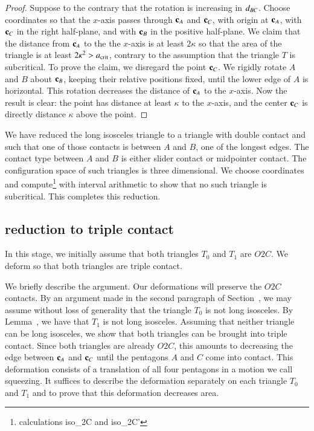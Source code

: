 \begin{proof} 
  Suppose to the contrary that the rotation is increasing in
  $d_{BC}$.  Choose coordinates so that the $x$-axis passes through
  ${\mathbf c}_A$ and ${\mathbf c}_C$, with origin at ${\mathbf c}_A$, with ${\mathbf c}_C$ in the right
  half-plane, and with ${\mathbf c}_B$ in the positive half-plane.  We claim
  that the distance from ${\mathbf c}_A$ to the the $x$-axis is at least
  $2\kappa$ so that the area of the triangle is at least $2\kappa^2 >
  a_\text{crit}$, contrary to the assumption that the triangle $T$ is
  subcritical.  To prove the claim, we disregard the point ${\mathbf c}_C$.  We
  rigidly rotate $A$ and $B$ about ${\mathbf c}_B$, keeping their relative
  positions fixed, until the lower edge of $A$ is horizontal.  This
  rotation decreases the distance of ${\mathbf c}_A$ to the $x$-axis.  Now the
  result is clear: the point has distance at least $\kappa$ to the
  $x$-axis, and the center ${\mathbf c}_C$ is directly distance $\kappa$ above
  the point.
\end{proof}

We have reduced the long isosceles triangle to a triangle with double
contact and such that one of those contacts is between $A$ and $B$,
one of the longest edges.  The contact type between $A$ and $B$ is
either slider contact or midpointer contact.  The configuration space
of such triangles is three dimensional.  We choose coordinates and
compute\footnote{calculations iso\_2C and iso\_2C'} with interval
arithmetic to show that no such triangle is subcritical.  This
completes this reduction.

\subsection{reduction to triple contact}

In this stage, we initially assume that both triangles $T_0$ and $T_1$
are $O2C$.  We deform so that both triangles are triple contact.

We briefly describe the argument.  Our deformations will preserve the
$O2C$ contacts.  By an argument made in the second paragraph of
Section~, we may assume without loss of generality that
the triangle $T_0$ is not long isosceles.  By
Lemma~, we have that $T_1$ is not long
isosceles.  Assuming that neither triangle can be long isosceles, we
show that both triangles can be brought into triple contact.  Since
both triangles are already $O2C$, this amounts to decreasing the edge
between ${\mathbf c}_A$ and ${\mathbf c}_C$ until the pentagons $A$ and $C$ come into
contact.  This deformation consists of a translation of all four
pentagons in a motion we call squeezing.  It suffices to describe the
deformation separately on each triangle $T_0$ and $T_1$ and to prove
that this deformation decreases area.


